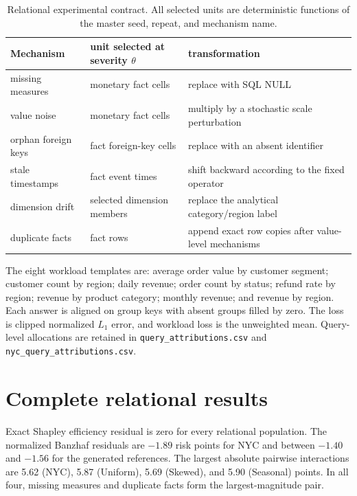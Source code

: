 \documentclass[conference]{IEEEtran}
\begin{document}
\begin{table}[t]
\caption{Relational experimental contract. All selected units are deterministic functions of the master seed, repeat, and mechanism name.}
\label{tab:contract}
\centering\small\setlength{\tabcolsep}{6pt}
\begin{tabular}{lll}
\toprule
Mechanism & unit selected at severity $\theta$ & transformation \\
\midrule
missing measures & monetary fact cells & replace with SQL NULL \\
value noise & monetary fact cells & multiply by a stochastic scale perturbation \\
orphan foreign keys & fact foreign-key cells & replace with an absent identifier \\
stale timestamps & fact event times & shift backward according to the fixed operator \\
dimension drift & selected dimension members & replace the analytical category/region label \\
duplicate facts & fact rows & append exact row copies after value-level mechanisms \\
\bottomrule
\end{tabular}
\end{table}

The eight workload templates are: average order value by customer segment; customer count by region; daily revenue; order count by status; refund rate by region; revenue by product category; monthly revenue; and revenue by region. Each answer is aligned on group keys with absent groups filled by zero. The loss is clipped normalized $L_1$ error, and workload loss is the unweighted mean. Query-level allocations are retained in \texttt{query\_attributions.csv} and \texttt{nyc\_query\_attributions.csv}.

\section{Complete relational results}



Exact Shapley efficiency residual is zero for every relational population. The normalized Banzhaf residuals are $-1.89$ risk points for NYC and between $-1.40$ and $-1.56$ for the generated references. The largest absolute pairwise interactions are 5.62 (NYC), 5.87 (Uniform), 5.69 (Skewed), and 5.90 (Seasonal) points. In all four, missing measures and duplicate facts form the largest-magnitude pair.
\end{document}

